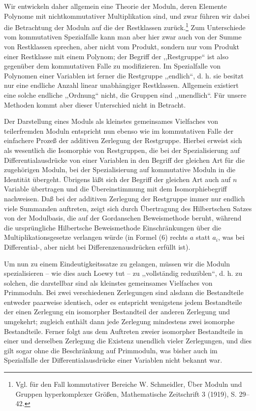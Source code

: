 \documentclass[11pt]{article}
\begin{document}
Wir entwickeln daher allgemein eine Theorie der Moduln, deren Elemente Polynome mit nichtkommutativer Multiplikation sind, und zwar führen wir dabei die Betrachtung der Moduln auf die der Restklassen zurück.\footnote{Vgl. für den Fall kommutativer Bereiche W. Schmeidler, Über Moduln und Gruppen hyperkomplexer Größen, Mathematische Zeitschrift 3 (1919), S. 29--42.} Zum Unterschiede vom kommutativen Spezialfalle kann man aber hier zwar auch von der Summe von Restklassen sprechen, aber nicht vom Produkt, sondern nur vom Produkt einer Restklasse mit einem Polynom; der Begriff der ,,Restgruppe`` ist also gegenüber dem kommutativen Falle zu modifizieren. Im Spezialfalle von Polynomen einer Variablen ist ferner die Restgruppe ,,endlich``, d. h. sie besitzt nur eine endliche Anzahl linear unabhängiger Restklassen. Allgemein existiert eine solche endliche ,,Ordnung`` nicht, die Gruppen sind ,,unendlich``. Für unsere Methoden kommt aber dieser Unterschied nicht in Betracht.

Der Darstellung eines Moduls als kleinstes gemeinsames Vielfaches von teilerfremden Moduln entspricht nun ebenso wie im kommutativen Falle der einfachere Prozeß der additiven Zerlegung der Restgruppe. Hierbei erweist sich als wesentlich die Isomorphie von Restgruppen, die bei der Spezialisierung auf Differentialausdrücke von einer Variablen in den Begriff der gleichen Art für die zugehörigen Moduln, bei der Spezialisierung auf kommutative Moduln in die Identität übergeht. Übrigens läßt sich der Begriff der gleichen Art auch auf $n$ Variable übertragen und die Übereinstimmung mit dem Isomorphiebegriff nachweisen. Daß bei der additiven Zerlegung der Restgruppe immer nur endlich viele Summanden auftreten, zeigt sich durch Übertragung des Hilbertschen Satzes von der Modulbasis, die auf der Gordanschen Beweismethode beruht, während die ursprüngliche Hilbertsche Beweismethode Einschränkungen über die Multiplikationsgesetze verlangen würde (in Formel (6) rechts $a$ statt $a_i$, was bei Differential-, aber nicht bei Differenzenausdrücken erfüllt ist).

Um nun zu einem Eindeutigkeitssatze zu gelangen, müssen wir die Moduln spezialisieren -- wie dies auch Loewy tut -- zu ,,vollständig reduziblen``, d. h. zu solchen, die darstellbar sind als kleinstes gemeinsames Vielfaches von Primmoduln. Bei zwei verschiedenen Zerlegungen sind alsdann die Bestandteile entweder paarweise identisch, oder es entspricht wenigstens jedem Bestandteile der einen Zerlegung ein isomorpher Bestandteil der anderen Zerlegung und umgekehrt; zugleich enthält dann jede Zerlegung mindestens zwei isomorphe Bestandteile. Ferner folgt aus dem Auftreten zweier isomorpher Bestandteile in einer und derselben Zerlegung die Existenz unendlich vieler Zerlegungen, und dies gilt sogar ohne die Beschränkung auf Primmoduln, was bisher auch im Spezialfalle der Differentialausdrücke einer Variablen nicht bekannt war.
\end{document}
